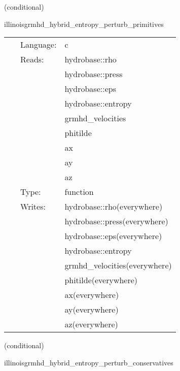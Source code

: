 \documentclass{article}
\begin{document}
\vspace{5mm}

   (conditional) 

\hspace{5mm} illinoisgrmhd\_hybrid\_entropy\_perturb\_primitives 

\hspace{5mm}{\it entropy+hybrid version of illinoisgrmhd\_perturb\_primitives } 


\hspace{5mm}

 \begin{tabular*}{160mm}{cll} 
~ & Language:  & c \\ 
~ & Reads:  & hydrobase::rho \\ 
~& ~ &hydrobase::press\\ 
~& ~ &hydrobase::eps\\ 
~& ~ &hydrobase::entropy\\ 
~& ~ &grmhd\_velocities\\ 
~& ~ &phitilde\\ 
~& ~ &ax\\ 
~& ~ &ay\\ 
~& ~ &az\\ 
~ & Type:  & function \\ 
~ & Writes:  & hydrobase::rho(everywhere) \\ 
~& ~ &hydrobase::press(everywhere)\\ 
~& ~ &hydrobase::eps(everywhere)\\ 
~& ~ &hydrobase::entropy\\ 
~& ~ &grmhd\_velocities(everywhere)\\ 
~& ~ &phitilde(everywhere)\\ 
~& ~ &ax(everywhere)\\ 
~& ~ &ay(everywhere)\\ 
~& ~ &az(everywhere)\\ 
\end{tabular*} 


\vspace{5mm}

   (conditional) 

\hspace{5mm} illinoisgrmhd\_hybrid\_entropy\_perturb\_conservatives 

\hspace{5mm}{\it entropy+hybrid version of illinoisgrmhd\_perturb\_conservatives } 
\end{document}
